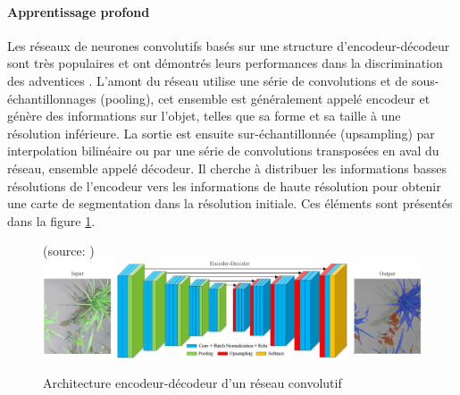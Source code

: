 \documentclass[../thesis.tex]{subfiles}
\begin{document}
    
    \paragraph{Apprentissage profond} Les réseaux de neurones convolutifs basés sur une structure d'encodeur-décodeur sont très populaires et ont démontrés leurs performances dans la discrimination des adventices \cite{brilhador2019classification, YOU2020105750, khan2020ced}. L'amont du réseau utilise une série de convolutions et de sous-échantillonnages (pooling), cet ensemble est généralement appelé encodeur et génère des informations sur l'objet, telles que sa forme et sa taille à une résolution inférieure. La sortie est ensuite sur-échantillonnée (upsampling) par interpolation bilinéaire ou par une série de convolutions transposées en aval du réseau, ensemble appelé décodeur. Il cherche à distribuer les informations basses résolutions de l'encodeur vers les informations de haute résolution pour obtenir une carte de segmentation dans la résolution initiale. Ces éléments sont présentés dans la figure \ref{fig:03-encoder-decoder}.
    
    \vfill
    \begin{figure}[H]
        \centering
        {\scriptsize (source: \cite{ma2019fully})}\\
        \includegraphics[width=\linewidth]{img/biblio/encoder-decoder}
        \caption{Architecture encodeur-décodeur d'un réseau convolutif}
        \label{fig:03-encoder-decoder}
    \end{figure}
    \vfill
    
    
\end{document}
